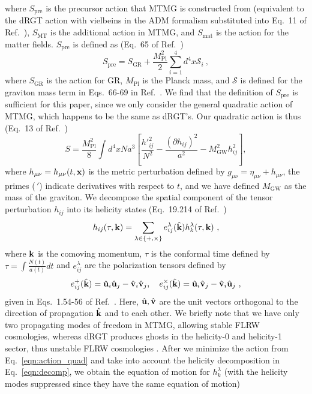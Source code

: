 \documentclass[prd,twocolumn,aps,psfig,nofootinbib,nobibnotes,superscriptaddress,preprintnumbers,times]{revtex4-2}
\begin{document}
\hspace{-1em}where $S_{\text{pre}}$ is the precursor action that MTMG is constructed from (equivalent to the dRGT action with vielbeins in the ADM formalism \cite{Arnowitt:1962hi} substituted into Eq.\ 11 of Ref.\ \cite{DeFelice:2015moy}), $S_{\text{MT}}$ is the additional action in MTMG, and $S_{\text{mat}}$
is the action for the matter fields. $S_{\text{pre}}$ is defined as (Eq.\ 65 of Ref.\ \cite{DeFelice:2015moy})
\begin{equation} \label{eqn:action_pre}
    S_{\text{pre}} = S_{\text{GR}} + \frac{M_{\text{Pl}}^2}{2}\sum_{i=1}^4 d^4x \mathcal{S}_i\ ,
\end{equation} 
where $S_{\text{GR}}$ is the action for GR, $M_{\text{Pl}}$ is the Planck mass, and $\mathcal{S}$ is defined for the graviton mass term in Eqs.\ 66-69 in Ref.\ \cite{DeFelice:2015moy}. We find that the definition of $S_\text{pre}$ is sufficient for this paper, since we only consider the general quadratic action of MTMG, which happens to be the same as dRGT's. Our quadratic action is thus (Eq.\ 13 of Ref.\ \cite{DeFelice:2015hla})
\begin{equation} \label{eqn:action_quad}
     S = \frac{M_{\text{Pl}}^2}{8}\int d^4xNa^3\left[ \frac{h'^2_{ij}}{N^2}- \frac{(\partial h_{ij})^2}{a^2} - M_{\text{GW}}^2h_{ij}^2 \right],
\end{equation}
where $h_{\mu\nu} = h_{\mu\nu}(t,{\bf x})$ is the metric perturbation defined by $g_{\mu\nu} = \eta_{\mu\nu} + h_{\mu\nu}$, the primes ($\,'$) indicate derivatives with respect to $t$, and we have defined $M_\text{GW}$ as the mass of the graviton. We decompose the spatial component of the tensor perturbation $h_{ij}$ into its helicity states (Eq.\ 19.214 of Ref.\ \cite{Maggiore:v2}) 
\begin{equation}\label{eqn:decomp}
    h_{ij}(\tau, {\bf k}) = \sum_{\lambda \in \{+, \times\}}e^\lambda_{ij}(\hat{\bf k})h_k^\lambda(\tau, {\bf k}) \ ,
\end{equation}
where ${\bf k}$ is the comoving momentum, $\tau$ is the conformal time defined by $\tau = \int \frac{N(t)}{a(t)}dt$ and $e^\lambda_{ij}$ are the polarization tensors defined by 
\begin{equation}\label{eqn:polarization}
    e^+_{ij}(\hat{\bf k}) = \hat{\bf u}_i\hat{\bf u}_j - \hat{\bf v}_i\hat{\bf v}_j, \quad e^\times_{ij}(\hat{\bf k}) = \hat{\bf u}_i\hat{\bf v}_j - \hat{\bf v}_i\hat{\bf u}_j\ ,
\end{equation}
given in Eqs.\ 1.54-56 of Ref.\ \cite{Maggiore:v1}. Here, $\hat{\bf u}, \hat{\bf v}$ are the unit vectors orthogonal to the direction of propagation $\hat{\bf k}$ and to each other. We briefly note that we have only two propagating modes of freedom in MTMG, allowing stable FLRW cosmologies, whereas dRGT produces ghosts in the helicity-0 and helicity-1 sector, thus unstable FLRW cosmologies \cite{DeFelice:2015hla}. After we minimize the action from Eq.\ \ref{eqn:action_quad} and take into account the helicity decomposition in Eq.\ \ref{eqn:decomp}, we obtain the equation of motion for $h_k^\lambda$ (with the helicity modes suppressed since they have the same equation of motion)
\end{document}
